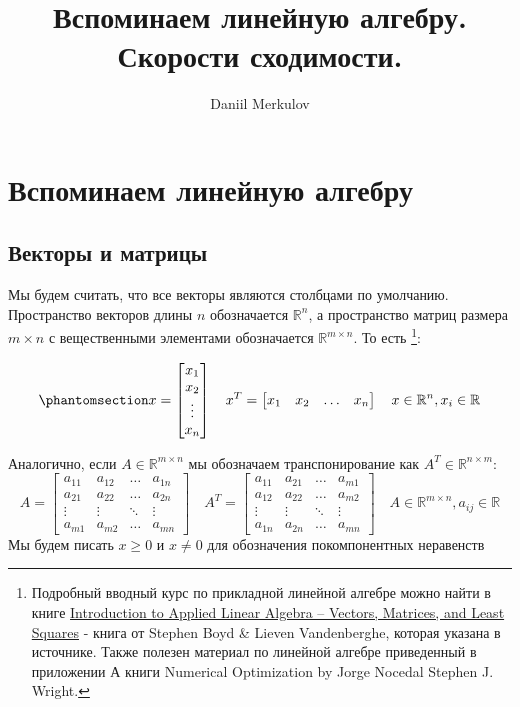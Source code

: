 \documentclass[
  russian,
  letterpaper,
  DIV=11,
  numbers=noendperiod]{scrartcl}
\title{Вспоминаем линейную алгебру. Скорости сходимости.}
\author{Daniil Merkulov}
\date{}
\begin{document}
\maketitle


\section{Вспоминаем линейную
алгебру}\label{ux432ux441ux43fux43eux43cux438ux43dux430ux435ux43c-ux43bux438ux43dux435ux439ux43dux443ux44e-ux430ux43bux433ux435ux431ux440ux443}

\subsection{Векторы и
матрицы}\label{ux432ux435ux43aux442ux43eux440ux44b-ux438-ux43cux430ux442ux440ux438ux446ux44b}

Мы будем считать, что все векторы являются столбцами по умолчанию.
Пространство векторов длины \(n\) обозначается \(\mathbb{R}^n\), а
пространство матриц размера \(m \times n\) с вещественными элементами
обозначается \(\mathbb{R}^{m \times n}\). То есть \footnote{Подробный
  вводный курс по прикладной линейной алгебре можно найти в книге
  \href{https://web.stanford.edu/~boyd/vmls/}{Introduction to Applied
  Linear Algebra -- Vectors, Matrices, and Least Squares} - книга от
  Stephen Boyd \& Lieven Vandenberghe, которая указана в источнике.
  Также полезен материал по линейной алгебре приведенный в приложении А
  книги Numerical Optimization by Jorge Nocedal Stephen J. Wright.}:

\begin{equation}\phantomsection\label{eq-vector}{
x = \begin{bmatrix}
x_1 \\
x_2 \\
\vdots \\
x_n
\end{bmatrix} \quad x^T = \begin{bmatrix}
x_1 & x_2 & \dots & x_n
\end{bmatrix} \quad x \in \mathbb{R}^n, x_i \in \mathbb{R}
}\end{equation}

Аналогично, если \(A \in \mathbb{R}^{m \times n}\) мы обозначаем
транспонирование как \(A^T \in \mathbb{R}^{n \times m}\): \[
A = \begin{bmatrix}
a_{11} & a_{12} & \dots & a_{1n} \\
a_{21} & a_{22} & \dots & a_{2n} \\
\vdots & \vdots & \ddots & \vdots \\
a_{m1} & a_{m2} & \dots & a_{mn}
\end{bmatrix} \quad A^T = \begin{bmatrix}
a_{11} & a_{21} & \dots & a_{m1} \\
a_{12} & a_{22} & \dots & a_{m2} \\
\vdots & \vdots & \ddots & \vdots \\
a_{1n} & a_{2n} & \dots & a_{mn}
\end{bmatrix} \quad A \in \mathbb{R}^{m \times n}, a_{ij} \in \mathbb{R}
\] Мы будем писать \(x \geq 0\) и \(x \neq 0\) для обозначения
покомпонентных неравенств
\end{document}
